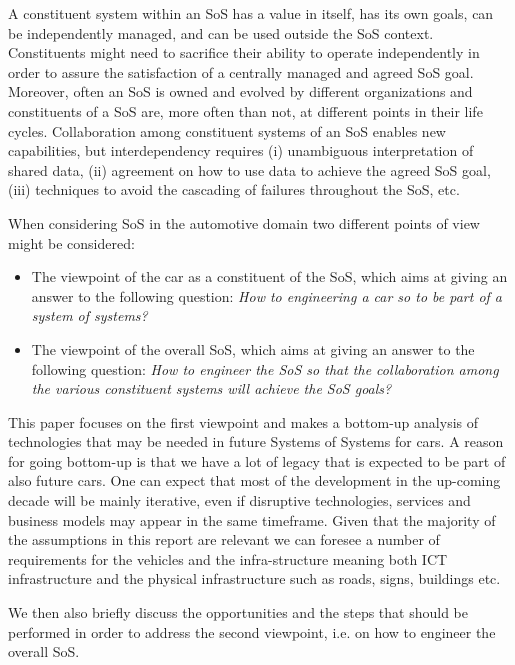 A constituent system within an SoS has a value in itself, has its own goals, can be independently managed, and can be used outside the SoS context. Constituents might need to sacrifice their ability to operate independently in order to assure the satisfaction of a centrally managed and agreed SoS goal. Moreover, often an SoS is owned and evolved by different organizations and constituents of a SoS are, more often than not, at different points in their life cycles. Collaboration among constituent systems of an SoS enables new capabilities, but interdependency requires (i) unambiguous interpretation of shared data, (ii) agreement on how to use data to achieve the agreed SoS goal, (iii) techniques to avoid the cascading of failures throughout the SoS, etc. %

When considering SoS in the automotive domain two different points of view might be considered: 

\begin{itemize}
\item The viewpoint of the car as a constituent of the SoS, which aims at giving an answer to the following question: {\em How to engineering a car so to be part of a system of systems?} %
\item The viewpoint of the overall SoS, which aims at giving an answer to the following question: {\em How to engineer the SoS so that the collaboration among the various constituent systems will achieve the SoS goals?}  
\end{itemize}

This paper focuses on the first viewpoint and makes a bottom-up analysis of technologies that may be needed in future Systems of Systems for cars. A reason for going bottom-up is that we have a lot of legacy that is expected to be part of also future cars. One can expect that most of the development in the up-coming decade  will be mainly iterative, even if disruptive technologies, services and business models may appear in the same timeframe. Given that the majority of the assumptions in this report are relevant we can foresee a number of requirements for the vehicles and the infra-structure meaning both ICT infrastructure and the physical infrastructure such as roads, signs, buildings etc. 

We then also briefly discuss the opportunities and the steps that should be performed in order to address the second viewpoint, i.e. on how to engineer the overall SoS. 

